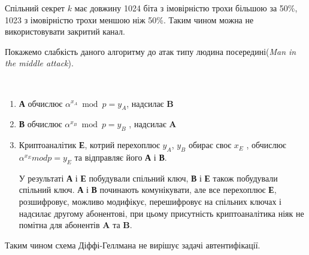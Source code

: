 Спільний секрет $k$ має довжину 1024 біта з імовірністю трохи більшою за 50\%, 1023 з імовірністю трохи меншою ніж 50\%.
Таким чином можна не використовувати закритий канал.

Покажемо слабкість даного алгоритму до атак типу людина посередині(\textit{Man in the middle attack}).

\begin{algorithm}\
\begin{enumerate}
\item \textbf{А} обчислює $\alpha ^{x_A} \bmod p = y_A $, надсилає \textbf{B} 

\item \textbf{В} обчислює $\alpha ^{x_B} \bmod p = y_B $ , надсилає \textbf{A}

\item Криптоаналітик \textbf{Е}, котрий перехоплює $y_A$, $y_B$ обирає своє $x_E$ , обчислює $\alpha ^{x_E} mod p = y_E $ та відправляє його \textbf{А} і \textbf{В}.

У результаті \textbf{А} і \textbf{Е} побудували спільний ключ, \textbf{В} і \textbf{Е} також побудували спільний ключ. 
\textbf{А} і \textbf{В} починають комунікувати, але все перехоплює \textbf{Е}, розшифровує, можливо модифікує, перешифровує на спільних ключах і надсилає другому абонентові, при цьому присутність криптоаналітика ніяк не помітна для абонентів \textbf{A} та \textbf{B}.
\end{enumerate}

\end{algorithm}
Таким чином схема Діффі-Геллмана не вирішує задачі автентифікації.
